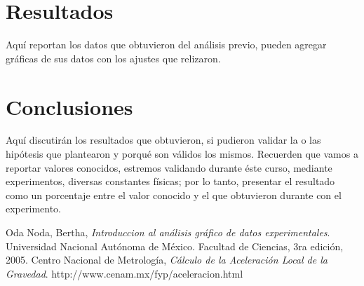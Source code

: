 \documentclass[10pt,letterpaper]{article}
\begin{document}
\section{Resultados}
Aquí reportan los datos que obtuvieron del análisis previo, pueden agregar gráficas de sus datos con los ajustes que relizaron.

\section{Conclusiones}
Aquí discutirán los resultados que obtuvieron, si pudieron validar la o las hipótesis que plantearon y porqué son válidos los mismos.
Recuerden que vamos a reportar valores conocidos, estremos validando durante éste curso, mediante experimentos, diversas constantes físicas; por lo tanto, presentar el resultado como un porcentaje entre el valor conocido y el que obtuvieron durante con el experimento. 


\begin{thebibliography}{9}

  Oda Noda, Bertha,
  \emph{Introduccion al análisis gráfico de datos experimentales}.
  Universidad Nacional Autónoma de México. Facultad de Ciencias,
  3ra edición,
  2005.
  Centro Nacional de Metrología, 
  \emph{Cálculo de la Aceleración Local de la Gravedad}. 
  http://www.cenam.mx/fyp/aceleracion.html
\end{thebibliography}
\end{document}
